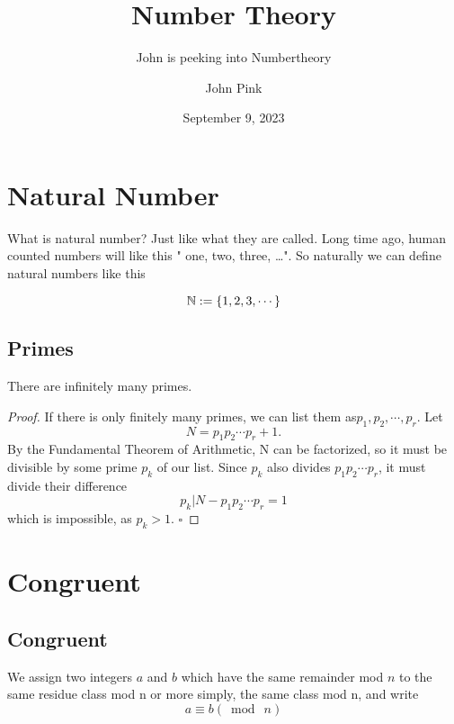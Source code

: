 \documentclass[11pt]{Numbertheory}
\title{Number Theory}
\subtitle{John is peeking into Numbertheory}
\author{John Pink}
\date{September 9, 2023}
\begin{document}
\maketitle

\frontmatter
\tableofcontents

\mainmatter

\chapter{Natural Number}

What is natural number? Just like what they are called. Long time ago, human counted numbers will like this " one, two, three, \ldots ".
So naturally we can define natural numbers like this 

\begin{definition} 
    \[ \mathbb{N} := \{1, 2, 3, \cdots\}\]
\end{definition}


\section{Primes}
\begin{theorem} [Euclid]
    There are infinitely many primes.
\end{theorem}

\begin{proof}
    If there is only finitely many primes, we can list them as$p_1, p_2, \cdots, p_r$. Let
    \[ N = p_1p_2\cdots p_r + 1. \]
    By the Fundamental Theorem of Arithmetic, N can be factorized, so it must be divisible by some prime $p_k$
    of our list. Since $p_k$ also divides $p_1p_2\cdots p_r$, it must divide their difference
    \[   p_k | N -  p_1p_2\cdots p_r = 1                  \]
    which is impossible, as $p_k > 1$.  $\square$
\end{proof}


\chapter{Congruent}

\section{Congruent}
\begin{definition}
    We assign two integers $a$ and $b$ which have the same remainder mod $n$ to the same residue class mod n or more 
    simply, the same class mod n, and write
    \[ a \equiv b (\bmod \ n)\]
\end{definition}
\end{document}
